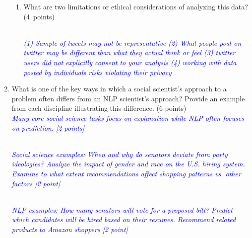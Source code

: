 \documentclass[12pt]{article}
\newcommand{\solution}[2]{\\[2mm] \textcolor{blue}{\em #1}} %
\begin{document}
\begin{enumerate}
\begin{enumerate}
    
    \item What are two limitations or ethical considerations of analyzing this data? (4~points)

    \solution{(1) Sample of tweets may not be representative (2) What people post on twitter may be different than what they actual think or feel (3) twitter users did not explicitly consent to your analysis (4) working with data posted by individuals risks violating their privacy}{\vspace{4cm}}
\end{enumerate}

\item What is one of the key ways in which a social scientist's approach to a problem often differs from an NLP scientist's approach? Provide an example from each discipline illustrating this difference. (6 points)
\solution{Many core social science tasks focus on explanation while NLP often focuses on prediction. [2 points]}{\vspace{7cm}}

\solution{Social science examples: When and why do senators deviate from party ideologies? Analyze the impact of gender and race on the U.S. hiring system. Examine to what extent recommendations affect shopping patterns vs. other factors [2 point]}{}

\solution{NLP examples: How many senators will vote for a proposed bill? Predict which candidates will be hired based on their resumes. Recommend related products to Amazon shoppers [2 point]}{}



{\vspace{8cm}}
\end{enumerate}
\end{document}
